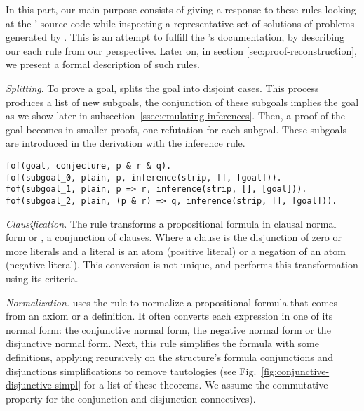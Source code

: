 \documentclass[../main.tex]{subfiles}
\begin{document}

In this part, our main purpose consists of giving a response to
these rules looking at the \Metis' source code while inspecting a
representative set of solutions of \CPL problems
\cite{Prieto-Cubides2017} generated by \Metis.
This is an attempt to fulfill the \Metis's documentation, by
describing our each rule from our perspective. Later on, in section
\ref{sec:proof-reconstruction}, we present a formal description of
such rules.

\vskip 2mm


\textit{Splitting}. To prove a goal, \Metis splits the goal into
disjoint cases. This process produces a list of new subgoals, the
conjunction of these subgoals implies the goal as we show later in
subsection~\ref{ssec:emulating-inferences}. Then, a proof of the
goal becomes in smaller proofs, one refutation for each subgoal.
These subgoals are introduced in the \TSTP derivation with the \strip
inference rule.

\begin{verbatim}
fof(goal, conjecture, p & r & q).
fof(subgoal_0, plain, p, inference(strip, [], [goal])).
fof(subgoal_1, plain, p => r, inference(strip, [], [goal])).
fof(subgoal_2, plain, (p & r) => q, inference(strip, [], [goal])).
\end{verbatim}


\textit{Clausification.} The \clausify rule transforms a
propositional formula in clausal normal form or \CNF, a conjunction
of clauses. Where a clause is the disjunction of zero or more
literals and a literal is an atom (positive literal) or a negation
of an atom (negative literal). This conversion is not unique, and
\Metis performs this transformation using its criteria.


\textit{Normalization.} \Metis uses the \canonicalize rule to
normalize a propositional formula that comes from an axiom or a
definition. It often converts each expression in one of its normal
form: the conjunctive normal form, the negative normal form or the
disjunctive normal form. Next, this rule simplifies the formula
with some definitions, applying recursively on the structure's
formula conjunctions and disjunctions simplifications to remove
tautologies (see Fig.~\ref{fig:conjunctive-disjunctive-simpl} for a
list of these theorems. We assume the commutative property for the
conjunction and disjunction connectives).
\end{document}
